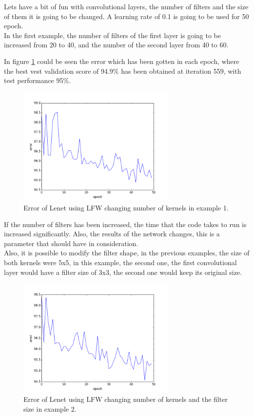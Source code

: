 Lets have a bit of fun with convolutional layers, the number of filters and the size of them it is going to be changed. A learning rate of 0.1 is going to be used for 50 epoch.\\

In the first example, the number of filters of the first layer is going to be increased from 20 to 40, and the number of the second layer from 40 to 60.

In figure \ref{fig:LENETLFW_ker1} could be seen the error which has been gotten in each epoch, where the best vest validation score of 94.9\% has been obtained at iteration 559, with test performance 95\%.

\begin{figure}[htb]
\centering
\includegraphics[width=0.7\textwidth]{images/LFW_layers/error_conv_40_60.png}
\caption{Error of Lenet using LFW changing number of kernels in example 1.} \label{fig:LENETLFW_ker1}
\end{figure}

If the number of filters has been increased, the time that the code takes to run is increased significantly. Also, the results of the network changes, this is a parameter that should have in consideration.\\

Also, it is possible to modify the filter shape, in the previous examples, the size of both kernels were 5x5, in this example, the second one, the first convolutional layer would have a filter size of 3x3, the second one would keep its original size.\\

\begin{figure}[htb]
\centering
\includegraphics[width=0.7\textwidth]{images/LFW_layers/error_conv_40_60_2.png}
\caption{Error of Lenet using LFW changing number of kernels and the filter size in example 2.} \label{fig:LENETLFW_ker2}
\end{figure}

